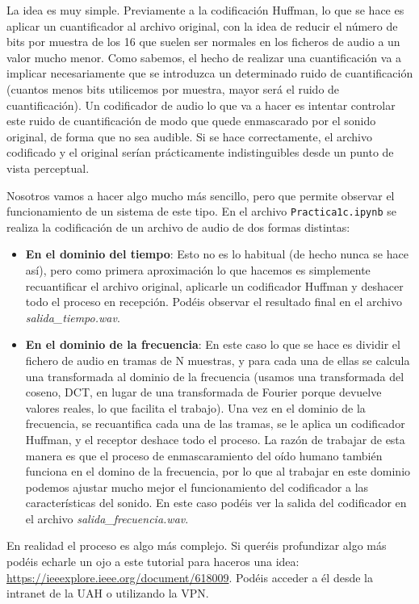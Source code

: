 \documentclass[es,practica]{uah}
\begin{document}
La idea es muy simple. Previamente a la codificación Huffman, lo que se hace es aplicar un cuantificador al archivo original, con la idea de reducir el número de bits por muestra de los 16 que suelen ser normales en los ficheros de audio a un valor mucho menor. Como sabemos, el hecho de realizar una cuantificación va a implicar necesariamente que se introduzca un determinado ruido de cuantificación (cuantos menos bits utilicemos por muestra, mayor será el ruido de cuantificación). Un codificador de audio lo que va a hacer es intentar controlar este ruido de cuantificación de modo que quede enmascarado por el sonido original, de forma que no sea audible. Si se hace correctamente, el archivo codificado y el original serían prácticamente indistinguibles desde un punto de vista perceptual. 

Nosotros vamos a hacer algo mucho más sencillo, pero que permite observar el funcionamiento de un sistema de este tipo. En el archivo \texttt{Practica1c.ipynb} se realiza la codificación de un archivo de audio de dos formas distintas:

\begin{itemize}
	\item {\bf En el dominio del tiempo}: Esto no es lo habitual (de hecho nunca se hace así), pero como primera aproximación lo que hacemos es simplemente recuantificar el archivo original, aplicarle un codificador Huffman y deshacer todo el proceso en recepción. Podéis observar el resultado final en el archivo \emph{salida\_tiempo.wav}.
	\item {\bf En el dominio de la frecuencia}: En este caso lo que se hace es dividir el fichero de audio en tramas de N muestras, y para cada una de ellas se calcula una transformada al dominio de la frecuencia (usamos una transformada del coseno, DCT, en lugar de una transformada de Fourier porque devuelve valores reales, lo que facilita el trabajo). Una vez en el dominio de la frecuencia, se recuantifica cada una de las tramas, se le aplica un codificador Huffman, y el receptor deshace todo el proceso. La razón de trabajar de esta manera es que el proceso de enmascaramiento del oído humano también funciona en el domino de la frecuencia, por lo que al trabajar en este dominio podemos ajustar mucho mejor el funcionamiento del codificador a las características del sonido. En este caso podéis ver la salida del codificador en el archivo \emph{salida\_frecuencia.wav}.
\end{itemize}


En realidad el proceso es algo más complejo. Si queréis profundizar algo más podéis echarle un ojo a este tutorial para haceros una idea: \url{https://ieeexplore.ieee.org/document/618009}. Podéis acceder a él desde la intranet de la UAH o utilizando la VPN. 
\end{document}
